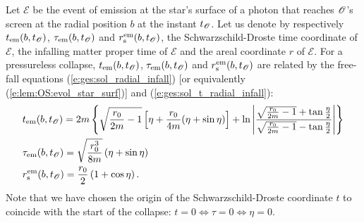 Let $\mathscr{E}$ be the event of emission at the star's surface of a photon that reaches
$\mathscr{O}$'s screen at the radial position $b$ at the instant $t_{\mathscr{O}}$.
Let us denote by respectively $t_{\rm em}(b,t_{\mathscr{O}})$,
$\tau_{\rm em}(b,t_{\mathscr{O}})$ and $r_{\rm s}^{\rm em}(b,t_{\mathscr{O}})$,
the Schwarzschild-Droste time
coordinate of $\mathscr{E}$, the infalling matter proper time of $\mathscr{E}$
and the areal coordinate $r$ of $\mathscr{E}$.
For a pressureless collapse,
$t_{\rm em}(b,t_{\mathscr{O}})$, $\tau_{\rm em}(b,t_{\mathscr{O}})$ and $r_{\rm s}^{\rm em}(b,t_{\mathscr{O}})$
are related by the free-fall equations (\ref{e:ges:sol_radial_infall}) [or
equivalently (\ref{e:lem:OS:evol_star_surf})] and (\ref{e:ges:sol_t_radial_infall}):
\begin{subequations}
\label{e:lem:OS:free_fall_em}
\begin{align}
   & t_{\rm em}(b,t_{\mathscr{O}}) = 2m \left\{ \sqrt{\frac{r_0}{2m} - 1} \left[ \eta + \frac{r_0}{4m}
    (\eta + \sin\eta) \right]
    + \ln \left| \frac{\sqrt{\frac{r_0}{2m} - 1} + \tan\frac{\eta}{2}}{\sqrt{\frac{r_0}{2m} - 1} - \tan\frac{\eta}{2}} \right| \right\} \\
    & \tau_{\rm em}(b,t_{\mathscr{O}}) =\sqrt{\frac{r_0^3}{8 m}}  \left( \eta + \sin\eta \right) \\
    & r_{\rm s}^{\rm em}(b,t_{\mathscr{O}}) = \frac{r_0}{2} \left( 1 + \cos\eta \right) .
\end{align}
\end{subequations}
Note that we have chosen the origin of the Schwarzschild-Droste coordinate $t$
to coincide with the start of the collapse: $t = 0 \iff \tau = 0 \iff \eta = 0$.


